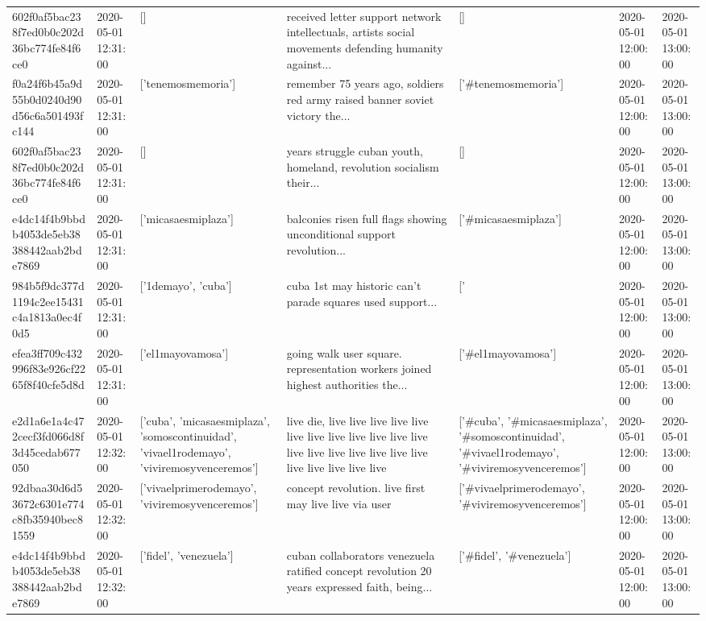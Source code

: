 \begin{tabular}{lllllll}
602f0af5bac238f7ed0b0c202d36bc774fe84f6ce0 & 2020-05-01 12:31:00 & [] & received letter support network intellectuals, artists social movements defending humanity against... & [] & 2020-05-01 12:00:00 & 2020-05-01 13:00:00 \\
f0a24f6b45a9d55b0d0240d90d56c6a501493fc144 & 2020-05-01 12:31:00 & ['tenemosmemoria'] & remember 75 years ago, soldiers red army raised banner soviet victory the... & ['#tenemosmemoria'] & 2020-05-01 12:00:00 & 2020-05-01 13:00:00 \\
602f0af5bac238f7ed0b0c202d36bc774fe84f6ce0 & 2020-05-01 12:31:00 & [] & years struggle cuban youth, homeland, revolution socialism their... & [] & 2020-05-01 12:00:00 & 2020-05-01 13:00:00 \\
e4dc14f4b9bbdb4053de5eb38388442aab2bde7869 & 2020-05-01 12:31:00 & ['micasaesmiplaza'] & balconies risen full flags showing unconditional support revolution... & ['#micasaesmiplaza'] & 2020-05-01 12:00:00 & 2020-05-01 13:00:00 \\
984b5f9dc377d1194c2ee15431c4a1813a0ec4f0d5 & 2020-05-01 12:31:00 & ['1demayo', 'cuba'] & cuba 1st may historic can't parade squares used support... & ['#1demayo', '#cuba'] & 2020-05-01 12:00:00 & 2020-05-01 13:00:00 \\
efea3ff709c432996f83e926cf2265f8f40cfe5d8d & 2020-05-01 12:31:00 & ['el1mayovamosa'] & going walk user square. representation workers joined highest authorities the... & ['#el1mayovamosa'] & 2020-05-01 12:00:00 & 2020-05-01 13:00:00 \\
e2d1a6e1a4c472cecf3fd066d8f3d45cedab677050 & 2020-05-01 12:32:00 & ['cuba', 'micasaesmiplaza', 'somoscontinuidad', 'vivael1rodemayo', 'viviremosyvenceremos'] & live die, live live live live live live live live live live live live live live live live live live live live live live live live & ['#cuba', '#micasaesmiplaza', '#somoscontinuidad', '#vivael1rodemayo', '#viviremosyvenceremos'] & 2020-05-01 12:00:00 & 2020-05-01 13:00:00 \\
92dbaa30d6d53672c6301e774c8fb35940bec81559 & 2020-05-01 12:32:00 & ['vivaelprimerodemayo', 'viviremosyvenceremos'] & concept revolution. live first may live live via user & ['#vivaelprimerodemayo', '#viviremosyvenceremos'] & 2020-05-01 12:00:00 & 2020-05-01 13:00:00 \\
e4dc14f4b9bbdb4053de5eb38388442aab2bde7869 & 2020-05-01 12:32:00 & ['fidel', 'venezuela'] & cuban collaborators venezuela ratified concept revolution 20 years expressed faith, being... & ['#fidel', '#venezuela'] & 2020-05-01 12:00:00 & 2020-05-01 13:00:00 \\

\end{tabular}
